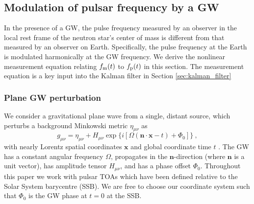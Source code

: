 \documentclass[fleqn,usenatbib,useAMS]{mnras}
\begin{document}
\subsection{Modulation of pulsar frequency by a GW} \label{sec:psr_measured}
In the presence of a GW, the pulse frequency measured by an observer in the local rest frame of the neutron star's center of mass is different from that measured by an observer on Earth. Specifically, the pulse frequency at the Earth is modulated harmonically at the GW frequency. We derive the nonlinear measurement equation relating $f_{\rm m}(t)$ to $f_{\rm p}(t)$ in this section. The measurement equation is a key input into the Kalman filter in Section \ref{sec:kalman_filter}
\subsubsection{Plane GW perturbation}\label{sec:plane_gw}
We consider a gravitational plane wave from a single, distant source, which perturbs a background Minkowski metric $\eta_{\mu \nu}$ as
\begin{equation}
	g_{\mu \nu} = \eta_{\mu \nu} + H_{\mu \nu} \exp{ \{ i[\Omega(\boldsymbol{n} \cdot \boldsymbol{x} - t) + \Phi_0] \} } \ ,
\end{equation}
with nearly Lorentz spatial coordinates $\boldsymbol{x}$ and global coordinate time $t$ \citep{schutz2022}. The GW has a constant angular frequency $\Omega$, propagates in the $\boldsymbol{n}$-direction (where $\boldsymbol{n}$ is a unit vector), has amplitude tensor $H_{\mu \nu}$, and has a phase offset  $\Phi_0$. Throughout this paper we work with pulsar TOAs which have been defined relative to the Solar System barycentre (SSB). We are free to choose our coordinate system such that $\Phi_0$ is the GW phase at $t=0$ at the SSB. \newline 
\end{document}
